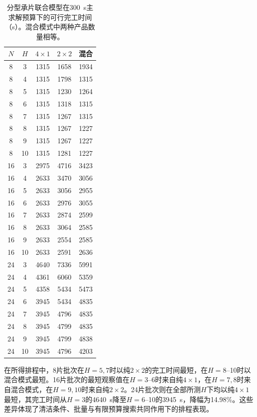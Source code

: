 \documentclass[final,5p,times,twocolumn]{elsarticle}
\begin{document}
\begin{table}[!t]
\centering\scriptsize\setlength{\tabcolsep}{3pt}
\caption{分型承片联合模型在300~s主求解预算下的可行完工时间（s）。混合模式中两种产品数量相等。}
\label{tab:joint-grid-cn}
\begin{tabular}{ccccc}\toprule
$N$ & $H$ & $4\times1$ & $2\times2$ & 混合\\\midrule
8 & 3 & 1315 & 1658 & 1934\\
8 & 4 & 1315 & 1798 & 1315\\
8 & 5 & 1315 & 1230 & 1264\\
8 & 6 & 1315 & 1318 & 1315\\
8 & 7 & 1315 & 1267 & 1315\\
8 & 8 & 1315 & 1267 & 1227\\
8 & 9 & 1315 & 1267 & 1227\\
8 & 10 & 1315 & 1281 & 1227\\
16 & 3 & 2975 & 4716 & 3423\\
16 & 4 & 2633 & 3470 & 3056\\
16 & 5 & 2633 & 3056 & 2955\\
16 & 6 & 2633 & 2976 & 3055\\
16 & 7 & 2633 & 2874 & 2599\\
16 & 8 & 2633 & 3064 & 2585\\
16 & 9 & 2633 & 2554 & 2585\\
16 & 10 & 2633 & 2591 & 2636\\
24 & 3 & 4640 & 7336 & 5991\\
24 & 4 & 4361 & 6060 & 5359\\
24 & 5 & 4358 & 5434 & 5473\\
24 & 6 & 3945 & 5434 & 4835\\
24 & 7 & 3945 & 4796 & 4835\\
24 & 8 & 3945 & 4799 & 4835\\
24 & 9 & 3945 & 4799 & 4838\\
24 & 10 & 3945 & 4796 & 4203\\
\bottomrule\end{tabular}\end{table}

在所得排程中，8片批次在$H=5,7$时以纯$2\times2$的完工时间最短，在$H=8$--10时以混合模式最短。16片批次的最短观察值在$H=3$--6时来自纯$4\times1$，在$H=7,8$时来自混合模式，在$H=9,10$时来自纯$2\times2$。24片批次则在全部所测$H$下均以纯$4\times1$最短，其完工时间从$H=3$的4640~s降至$H=6$--10的3945~s，降幅为14.98\%。这些差异体现了清洁条件、批量与有限预算搜索共同作用下的排程表现。
\end{document}
